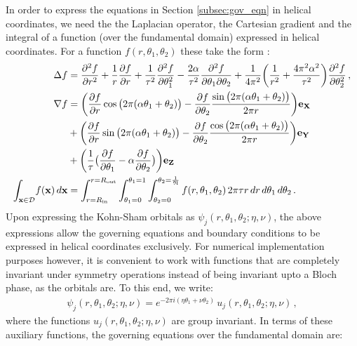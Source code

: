 \documentclass[preprint,12pt, 3p, sort&compress]{elsarticle}
\begin{document}
In order to express the equations in Section \ref{subsec:gov_eqn} in helical coordinates, we need the   the Laplacian operator, the Cartesian gradient and the integral of a function (over the fundamental domain) expressed in helical coordinates. For a function $f(r,\theta_1,\theta_2)$ these take the form \citep{banerjee2021ab}:
\begin{align}
\Delta f &= \frac{\partial^{2}f}{\partial r^{2}}+\frac{1}{r}\frac{\partial f}{\partial r}+\frac{1}{\tau^2}\frac{\partial^{2}f}{\partial\theta_1^{2}}-
\frac{2\alpha}{\tau^2}\frac{\partial^2 f}{\partial \theta_1  \partial\theta_2} +
\frac{1}{4\pi^2}\bigg(\frac{1}{r^2}+\frac{4\pi^2\alpha^2}{\tau^2}\bigg)\frac{\partial^{2}f}{\partial\theta_2^{2}}\,,\\\nonumber
\nabla f &= \bigg(\frac{\partial f}{\partial r} \cos{\big(2\pi(\alpha\theta_1 + \theta_2)\big)} - \frac{\partial f}{\partial\theta_2}\frac{\sin{\big(2\pi(\alpha\theta_1 + \theta_2)\big)}}{2\pi r}\bigg){\bf e}_{{\bf X}}\\\nonumber
&+ \bigg(\frac{\partial f}{\partial r} \sin{\big(2\pi(\alpha\theta_1 + \theta_2)\big)} - \frac{\partial f}{\partial\theta_2}\frac{\cos{\big(2\pi(\alpha\theta_1 + \theta_2)\big)}}{2\pi r}\bigg){\bf e}_{{\bf Y}}\\
&+ \bigg(\frac{1}{\tau}\big(\frac{\partial f}{\partial\theta_1} - \alpha \frac{\partial f}{\partial\theta_2}\big)\bigg){\bf e}_{{\bf Z}}\\
\int_{{\bf x} \in {\cal D}}\!f({\bf x})\,d{\bf x} &= \int_{r=R_{\text{in}}}^{r=R_{\text{out}}}\int_{\theta_1 = 0}^{\theta_1 = 1}\int_{\theta_2 = 0}^{\theta_2 = \frac{1}{\mathfrak{N}}}f(r,\theta_1,\theta_2)\,2\pi\tau r\,dr\,d{\theta_1}\,d{\theta_2}\,.
\end{align}
Upon expressing the Kohn-Sham orbitals as $\psi_j(r, \theta_1,\theta_2; \eta, \nu)$, the above expressions allow the governing equations and boundary conditions to be expressed in helical coordinates exclusively. For numerical implementation purposes however, it is convenient to work with functions that are completely invariant under symmetry operations instead of being invariant upto a Bloch phase, as the orbitals are. To this end, we write:
\begin{align}
 \psi_j(r, \theta_1,\theta_2; \eta, \nu) = e^{-2\pi i(\eta \theta_1 + \nu \theta_2)} \,u_j(r, \theta_1,\theta_2; \eta, \nu)\,,
 \label{eq:Bloch_ansatz}
\end{align}
where the functions $u_j(r, \theta_1,\theta_2; \eta, \nu)$ are group invariant. In terms of these auxiliary functions, the governing equations over the  fundamental domain are:
\end{document}
